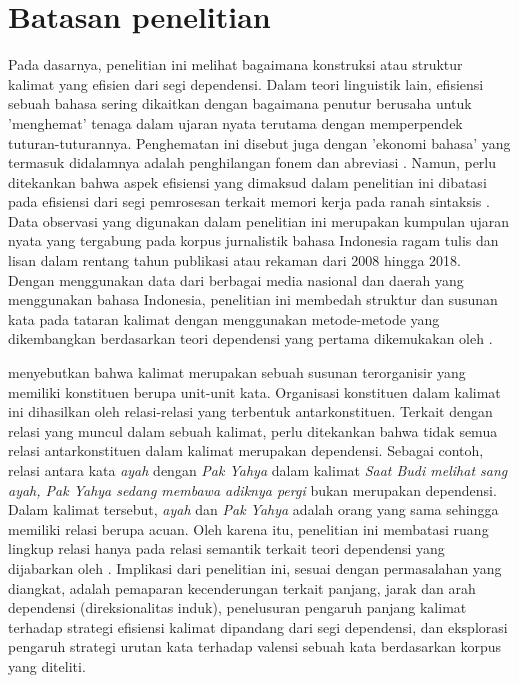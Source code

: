 \section{Batasan penelitian}
Pada dasarnya, penelitian ini melihat bagaimana konstruksi atau struktur kalimat yang efisien dari segi dependensi. Dalam teori linguistik lain, efisiensi sebuah bahasa sering dikaitkan dengan bagaimana penutur berusaha untuk 'menghemat' tenaga dalam ujaran nyata terutama dengan memperpendek tuturan-tuturannya. Penghematan ini disebut juga dengan 'ekonomi bahasa' yang termasuk didalamnya adalah penghilangan fonem dan abreviasi \citep{verhaar1996asas}. Namun, perlu ditekankan bahwa aspek efisiensi yang dimaksud dalam penelitian ini dibatasi pada efisiensi dari segi pemrosesan terkait memori kerja pada ranah sintaksis \citep{hawkins2014cross}. Data observasi yang digunakan dalam penelitian ini merupakan kumpulan ujaran nyata yang tergabung pada korpus jurnalistik bahasa Indonesia ragam tulis dan lisan dalam rentang tahun publikasi atau rekaman dari 2008 hingga 2018. Dengan menggunakan data dari berbagai media nasional dan daerah yang menggunakan bahasa Indonesia, penelitian ini membedah struktur dan susunan kata pada tataran kalimat dengan menggunakan metode-metode yang dikembangkan berdasarkan teori dependensi yang pertama dikemukakan oleh \cite{tesniere1959elements}. 

\citet[pp. 3-5]{tesniere1959elements} menyebutkan bahwa kalimat merupakan sebuah susunan terorganisir yang memiliki konstituen berupa unit-unit kata. Organisasi konstituen dalam kalimat ini dihasilkan oleh relasi-relasi yang terbentuk antarkonstituen. Terkait dengan relasi yang muncul dalam sebuah kalimat, perlu ditekankan bahwa tidak semua relasi antarkonstituen dalam kalimat merupakan dependensi. Sebagai contoh, relasi antara kata \textit{ayah} dengan \textit{Pak Yahya} dalam kalimat \textit{Saat Budi melihat sang ayah, Pak Yahya sedang membawa adiknya pergi} bukan merupakan dependensi. Dalam kalimat tersebut, \textit{ayah} dan \textit{Pak Yahya} adalah orang yang sama sehingga memiliki relasi berupa acuan. Oleh karena itu, penelitian ini membatasi ruang lingkup relasi hanya pada relasi semantik terkait teori dependensi yang dijabarkan oleh \cite{tesniere1959elements}. Implikasi dari penelitian ini, sesuai dengan permasalahan yang diangkat, adalah pemaparan kecenderungan terkait panjang, jarak dan arah dependensi (direksionalitas induk), penelusuran pengaruh panjang kalimat terhadap strategi efisiensi kalimat dipandang dari segi dependensi, dan eksplorasi pengaruh strategi urutan kata terhadap valensi sebuah kata berdasarkan korpus yang diteliti. 

